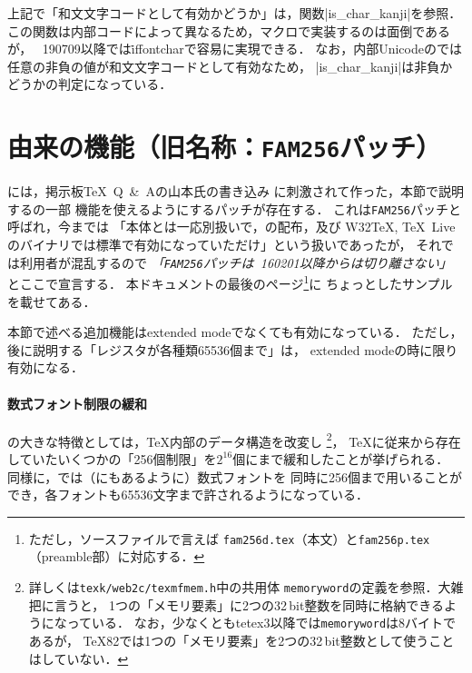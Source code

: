 \documentclass[a4paper,11pt,nomag,dvipdfmx]{jsarticle}
\begin{document}
\begin{dangerous}
  上記で「和文文字コードとして有効かどうか」は，関数|is_char_kanji|を参照．
  この関数は内部コードによって異なるため，マクロで実装するのは面倒であるが，
  \epTeX~190709以降では\.{iffontchar}で容易に実現できる．
  なお，内部Unicodeの\upTeX では任意の非負の値が和文文字コードとして有効なため，
  |is_char_kanji|は非負かどうかの判定になっている．
\end{dangerous}


\section{\OMEGA 由来の機能（旧名称：\texttt{FAM256}パッチ）}
\epTeX には，掲示板\TeX\ Q\ \&\ Aの山本氏の書き込み
\cite{yamamoto}に刺激されて作った，本節で説明する\OMEGA の一部
機能を使えるようにするパッチが存在する．
これは\texttt{FAM256}パッチと呼ばれ，今までは
「\epTeX 本体とは一応別扱いで，\epTeX の配布，及び
W32\TeX, \TeX~Liveのバイナリでは標準で有効になっていただけ」という扱いであったが，
それでは利用者が混乱するので
\emph{「\texttt{FAM256}パッチは\epTeX~160201以降からは切り離さない」}
とここで宣言する．
本ドキュメントの最後のページ\footnote{ただし，ソースファイルで言えば
\texttt{fam256d.tex}（本文）と\texttt{fam256p.tex}（preamble部）に対応する．}に
ちょっとしたサンプルを載せてある．

本節で述べる追加機能はextended modeでなくても有効になっている．
ただし，後に説明する「レジスタが各種類65536個まで」は，
extended modeの時に限り有効になる．

\paragraph{数式フォント制限の緩和}
\OMEGA の大きな特徴としては，\TeX 内部のデータ構造を改変し
\footnote{詳しくは\texttt{texk/web2c/texmfmem.h}中の共用体%
\texttt{memoryword}の定義を参照．大雑把に言うと，
1つの「メモリ要素」に2つの32\,bit整数を同時に格納できるようになっている．
なお，少なくともtetex3以降では\texttt{memoryword}は8バイトであるが，
\TeX 82では1つの「メモリ要素」を2つの32\,bit整数として使うことはしていない．
}，
\TeX に従来から存在していたいくつかの「256個制限」を$2^{16}$個にまで緩和したことが挙げられる．
同様に，\OMEGA では（\cite{yamamoto}にもあるように）数式フォントを
同時に256個まで用いることができ，各フォントも65536文字まで許されるようになっている．

\medskip
\end{document}
